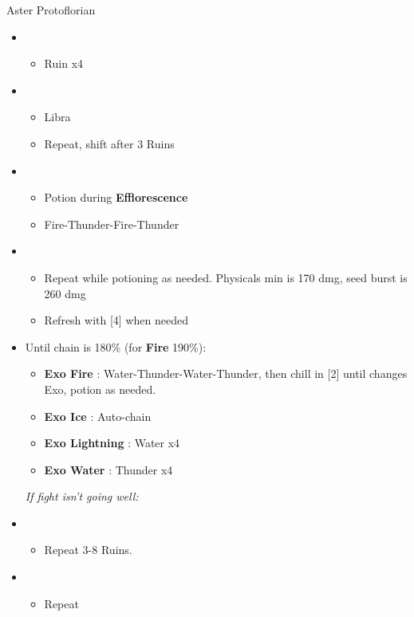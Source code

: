 \begin{battle}{Aster Protoflorian}
\begin{multicols}{2}
\begin{itemize}
    \item \first
    \begin{itemize}
        \item Ruin x4
    \end{itemize}
    \item \third
    \begin{itemize}
        \item Libra
        \item Repeat, shift after 3 Ruins
    \end{itemize}
    \item \fourth
    \begin{itemize}
        \item Potion during \textbf{Efflorescence}
        \item Fire-Thunder-Fire-Thunder
    \end{itemize}
    \item \fifth
    \begin{itemize}
        \item Repeat while potioning as needed. Physicals min is 170 dmg, seed burst is 260 dmg
        \item Refresh with [4] when needed
    \end{itemize}
    \item Until chain is 180\% (for \textbf{Fire} 190\%):
    \begin{itemize}
        \item \textbf{Exo Fire} : Water-Thunder-Water-Thunder, then chill in [2] until changes Exo, potion as needed.
        \item \textbf{Exo Ice} : Auto-chain
        \item \textbf{Exo Lightning} : Water x4
        \item \textbf{Exo Water} : Thunder x4
    \end{itemize}
    {\it If fight isn't going well:} 
    \item \first
    \begin{itemize}
        \item Repeat 3-8 Ruins.
    \end{itemize}
    \columnbreak
    \item \fourth
    \begin{itemize}
        \item Repeat

\end{itemize}
\end{itemize}
\end{multicols}
\end{battle}
